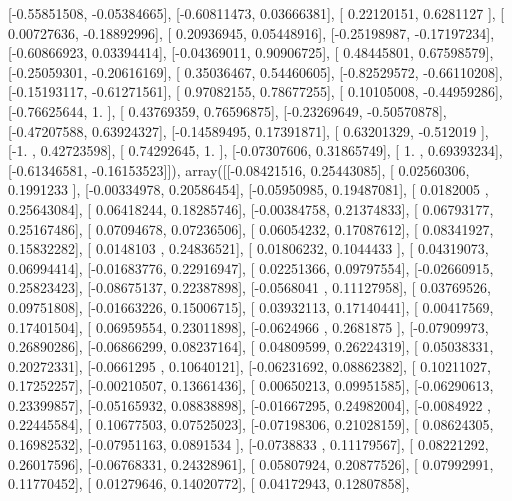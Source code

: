 \documentclass{article}
\begin{document}
       [-0.55851508, -0.05384665],
       [-0.60811473,  0.03666381],
       [ 0.22120151,  0.6281127 ],
       [ 0.00727636, -0.18892996],
       [ 0.20936945,  0.05448916],
       [-0.25198987, -0.17197234],
       [-0.60866923,  0.03394414],
       [-0.04369011,  0.90906725],
       [ 0.48445801,  0.67598579],
       [-0.25059301, -0.20616169],
       [ 0.35036467,  0.54460605],
       [-0.82529572, -0.66110208],
       [-0.15193117, -0.61271561],
       [ 0.97082155,  0.78677255],
       [ 0.10105008, -0.44959286],
       [-0.76625644,  1.        ],
       [ 0.43769359,  0.76596875],
       [-0.23269649, -0.50570878],
       [-0.47207588,  0.63924327],
       [-0.14589495,  0.17391871],
       [ 0.63201329, -0.512019  ],
       [-1.        ,  0.42723598],
       [ 0.74292645,  1.        ],
       [-0.07307606,  0.31865749],
       [ 1.        ,  0.69393234],
       [-0.61346581, -0.16153523]]), array([[-0.08421516,  0.25443085],
       [ 0.02560306,  0.1991233 ],
       [-0.00334978,  0.20586454],
       [-0.05950985,  0.19487081],
       [ 0.0182005 ,  0.25643084],
       [ 0.06418244,  0.18285746],
       [-0.00384758,  0.21374833],
       [ 0.06793177,  0.25167486],
       [ 0.07094678,  0.07236506],
       [ 0.06054232,  0.17087612],
       [ 0.08341927,  0.15832282],
       [ 0.0148103 ,  0.24836521],
       [ 0.01806232,  0.1044433 ],
       [ 0.04319073,  0.06994414],
       [-0.01683776,  0.22916947],
       [ 0.02251366,  0.09797554],
       [-0.02660915,  0.25823423],
       [-0.08675137,  0.22387898],
       [-0.0568041 ,  0.11127958],
       [ 0.03769526,  0.09751808],
       [-0.01663226,  0.15006715],
       [ 0.03932113,  0.17140441],
       [ 0.00417569,  0.17401504],
       [ 0.06959554,  0.23011898],
       [-0.0624966 ,  0.2681875 ],
       [-0.07909973,  0.26890286],
       [-0.06866299,  0.08237164],
       [ 0.04809599,  0.26224319],
       [ 0.05038331,  0.20272331],
       [-0.0661295 ,  0.10640121],
       [-0.06231692,  0.08862382],
       [ 0.10211027,  0.17252257],
       [-0.00210507,  0.13661436],
       [ 0.00650213,  0.09951585],
       [-0.06290613,  0.23399857],
       [-0.05165932,  0.08838898],
       [-0.01667295,  0.24982004],
       [-0.0084922 ,  0.22445584],
       [ 0.10677503,  0.07525023],
       [-0.07198306,  0.21028159],
       [ 0.08624305,  0.16982532],
       [-0.07951163,  0.0891534 ],
       [-0.0738833 ,  0.11179567],
       [ 0.08221292,  0.26017596],
       [-0.06768331,  0.24328961],
       [ 0.05807924,  0.20877526],
       [ 0.07992991,  0.11770452],
       [ 0.01279646,  0.14020772],
       [ 0.04172943,  0.12807858],
\end{document}
